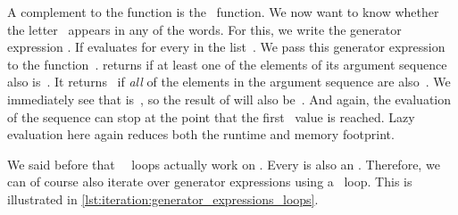 \begin{sloppypar}%
A complement to the  function is the ~function.
We now want to know whether the letter~ appears in any of the words.
For this, we write the generator expression .
If evaluates  for every  in the list~.
We pass this generator expression to the function~.
 returns  if at least one of the elements of its argument sequence also is~.
It returns~ if \emph{all} of the elements in the argument sequence are also~.
We immediately see that  is~, so the result of  will also be~.
And again, the evaluation of the sequence can stop at the point that the first~ value is reached.
Lazy evaluation here again reduces both the runtime and memory footprint.%
\end{sloppypar}%
%
%
%
%
We said before that \python\ ~loops actually work on .
Every  is also an .
Therefore, we can of course also iterate over generator expressions using a ~loop.
This is illustrated in \cref{lst:iteration:generator_expressions_loops}.

